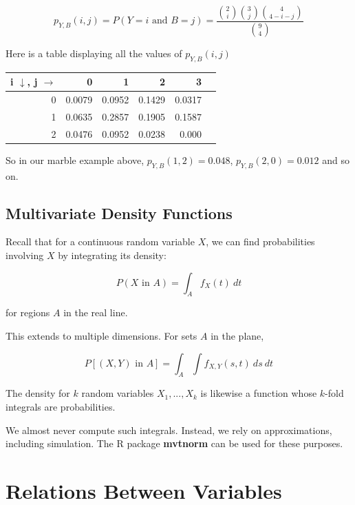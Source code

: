 \begin{equation}
p_{Y,B}(i,j) = P(Y = i \textrm{ and } B = j) = 
\frac
{
\binom{2}{i}
\binom{3}{j}
\binom{4}{4-i-j}
}
{\binom{9}{4}}
\end{equation}

Here is a table displaying all the values of $p_{Y,B}(i,j)$

\begin{tabular}{|r|r|r|r|r|r|}
\hline
i $\downarrow$, j $\rightarrow$ & 0 & 1 & 2 & 3 \\ \hline
0 & 0.0079 & 0.0952 & 0.1429 & 0.0317 \\ \hline
1 & 0.0635 & 0.2857 & 0.1905 & 0.1587 \\ \hline
2 & 0.0476 & 0.0952 & 0.0238 & 0.000 \\ \hline
\end{tabular}

So in our marble example above, $p_{Y,B}(1,2) = 0.048$, $p_{Y,B}(2,0) =
0.012$ and so on.

\subsection{Multivariate Density Functions}

Recall that for a continuous random variable $X$, we can find
probabilities involving $X$ by integrating its density:

\begin{equation}
P(X \textrm{ in } A) = \int_{A} f_X(t) ~ dt
\end{equation}

for regions $A$ in the real line.

This extends to multiple dimensions.  For sets $A$ in the plane,

\begin{equation}
P[(X,Y) \textrm{ in } A] = \int_{A} \int f_{X,Y}(s,t) ~ ds  ~ dt
\end{equation}

The density for $k$ random variables $X_1,...,X_k$ is likewise a
function whose $k$-fold integrals are probabilities.  

We almost never compute such integrals.  Instead, we rely on
approximations, including simulation.  The R package \textbf{mvtnorm}
can be used for these purposes.

\section{Relations Between Variables}


